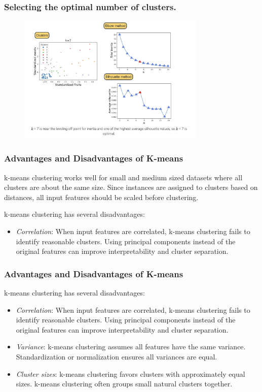 \documentclass[10pt,dvipsnames]{beamer}
\begin{document}
\begin{frame}
    \frametitle{Selecting the optimal number of clusters.}
    \begin{figure}[ht]
        \centering
        \includegraphics[width=0.8\textwidth]{imgs/k_mean_13.png}
    \end{figure}
\end{frame}

\begin{frame}
    \frametitle{Advantages and Disadvantages of K-means}
    k-means clustering works well for small and medium sized datasets where all clusters are about the same size. Since instances are assigned to clusters based on distances, all input features should be scaled before clustering.

    k-means clustering has several disadvantages:
    \begin{itemize}
        \item \textit{Correlation}: When input features are correlated, k-means clustering fails to identify reasonable clusters. Using principal components instead of the original features can improve interpretability and cluster separation.
    \end{itemize}
\end{frame}

\begin{frame}
    \frametitle{Advantages and Disadvantages of K-means}
    k-means clustering has several disadvantages:
    \begin{itemize}
        \item \textit{Correlation}: When input features are correlated, k-means clustering fails to identify reasonable clusters. Using principal components instead of the original features can improve interpretability and cluster separation.
        \item \textit{Variance}: k-means clustering assumes all features have the same variance. Standardization or normalization ensures all variances are equal.
        \item \textit{Cluster sizes}: k-means clustering favors clusters with approximately equal sizes. k-means clustering often groups small natural clusters together.
    \end{itemize}
\end{frame}
\end{document}

